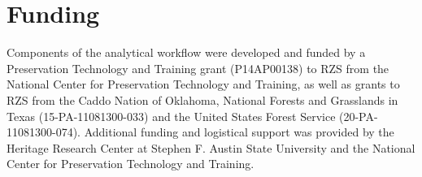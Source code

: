 \documentclass[]{interact}
\theoremstyle{plain}%
\theoremstyle{definition}
\theoremstyle{remark}
\begin{document}
\hypertarget{funding}{%
\section*{Funding}\label{funding}}

Components of the analytical workflow were developed and funded by a
Preservation Technology and Training grant (P14AP00138) to RZS from the
National Center for Preservation Technology and Training, as well as
grants to RZS from the Caddo Nation of Oklahoma, National Forests and
Grasslands in Texas (15-PA-11081300-033) and the United States Forest
Service (20-PA-11081300-074). Additional funding and logistical support
was provided by the Heritage Research Center at Stephen F. Austin State
University and the National Center for Preservation Technology and
Training.



\end{document}
